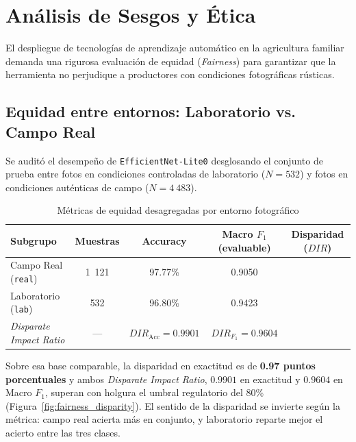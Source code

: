 \documentclass[12pt,letterpaper]{article}
\begin{document}
\newpage

\section{An\'alisis de Sesgos y \'Etica}

El despliegue de tecnolog\'ias de aprendizaje autom\'atico en la agricultura familiar demanda una rigurosa evaluaci\'on de equidad (\textit{Fairness}) para garantizar que la herramienta no perjudique a productores con condiciones fotogr\'aficas r\'usticas.

\subsection{Equidad entre entornos: Laboratorio vs. Campo Real}

Se audit\'o el desempe\~no de \texttt{EfficientNet-Lite0} desglosando el conjunto de prueba entre fotos en condiciones controladas de laboratorio ($N=532$) y fotos en condiciones aut\'enticas de campo ($N=4~483$).

\begin{table}[H]
\caption{M\'etricas de equidad desagregadas por entorno fotogr\'afico}
\label{tab:fairness_env}
\centering
\small
\begin{singlespace}
\begin{tabular}{lcccc}
\toprule
\textbf{Subgrupo} & \textbf{Muestras} & \textbf{Accuracy} & \textbf{Macro $F_1$ (evaluable)} & \textbf{Disparidad ($DIR$)} \\
\midrule
Campo Real (\texttt{real}) & 1~121 & 97.77\% & 0.9050 \\
Laboratorio (\texttt{lab}) & 532 & 96.80\% & 0.9423 \\
\midrule
\textit{Disparate Impact Ratio} & — & $DIR_{\text{Acc}} = 0.9901$ & $DIR_{F_1} = 0.9604$ \\
\bottomrule
\end{tabular}
\end{singlespace}
\end{table}

Sobre esa base comparable, la disparidad en exactitud es de \textbf{0.97 puntos porcentuales} y ambos \textit{Disparate Impact Ratio}, $0.9901$ en exactitud y $0.9604$ en Macro $F_1$, superan con holgura el umbral regulatorio del 80\% (Figura~\ref{fig:fairness_disparity}). El sentido de la disparidad se invierte seg\'un la m\'etrica: campo real acierta m\'as en conjunto, y laboratorio reparte mejor el acierto entre las tres clases.
\end{document}

